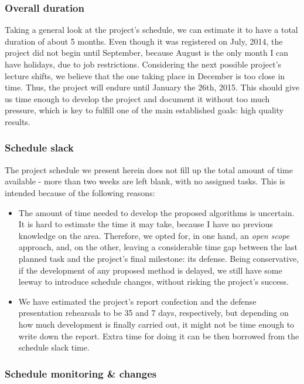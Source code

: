 \subsubsection{Overall duration}

Taking a general look at the project’s schedule, we can estimate it to have a total duration of about 5 months. Even though it was registered on July, 2014, the project did not begin until September, because August is the only month I can have holidays, due to job restrictions. Considering the next possible project’s lecture shifts, we believe that the one taking place in December is too close in time. Thus, the project will endure until January the 26th, 2015. This should give us time enough to develop the project and document it without too much pressure, which is key to fulfill one of the main established goals: high quality results.

\subsubsection{Schedule slack}

The project schedule we present herein does not fill up the total amount of time available - more than two weeks are left blank, with no assigned tasks. This is intended because of the following reasons:

\begin{itemize}
	\item The amount of time needed to develop the proposed algorithms is uncertain. It is hard to estimate the time it may take, because I have no previous knowledge on the area. Therefore, we opted for, in one hand, an \textit{open scope} approach, and, on the other, leaving a considerable time gap between the last planned task and the project’s final milestone: its defense. Being conservative, if the development of any proposed method is delayed, we still have some leeway to introduce schedule changes, without risking the project’s success.
	
	\item We have estimated the project’s report confection and the defense presentation rehearsals to be 35 and 7 days, respectively, but depending on how much development is finally carried out, it might not be time enough to write down the report. Extra time for doing it can be then borrowed from the schedule slack time.
	
\end{itemize}

\subsubsection{Schedule monitoring \& changes}

